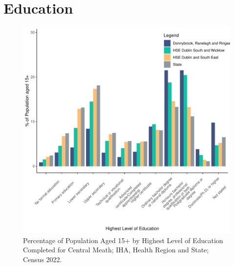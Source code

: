 \documentclass{article}
\begin{document}
\section{Education}\label{sect:Edu}
\begin{figure}[H]
	\centering
	\includegraphics[width = 120mm]{../figures/EduED.pdf}
	\caption{Percentage of Population Aged 15+ by Highest Level of Education Completed for Central Meath; IHA, Health Region and State; Census 2022.}
	\label{fig:vbnv}
	\end{figure}
\end{document}
